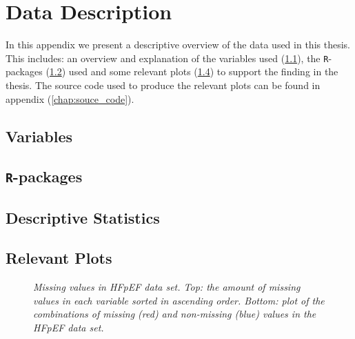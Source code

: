 \documentclass[../thesis.tex]{subfiles}
\begin{document}
\appendix

\chapter{Data Description}
\label{chap:data_desc}

\noindent In this appendix we present a descriptive overview of the data used in this thesis. This includes: an overview and explanation of the variables used (\ref{sec:variables}), the \texttt{R}-packages (\ref{sec:r_pack}) used and some relevant plots (\ref{sec:rel_plots}) to support the finding in the thesis. The source code used to produce the relevant plots can be found in appendix (\ref{chap:souce_code}).  

\section{Variables}
\label{sec:variables}

\section{\texttt{R}-packages}
\label{sec:r_pack}

\section{Descriptive Statistics}
\label{sec:desc_stat}





\newpage

\section{Relevant Plots}
\label{sec:rel_plots}

\begin{figure}[h!]
    \centering
    \hspace*{-1cm}\resizebox{1.1\textwidth}{!}{\footnotesize}
    \caption[Missing values in HFpEF data set]{\textit{Missing values in HFpEF data set. Top:  the amount of missing values in each variable sorted in ascending order. Bottom: plot of the combinations of missing (red) and non-missing (blue) values in the HFpEF data set.}}
    \label{fig:HFpEF_missing}
\end{figure}
\end{document}
